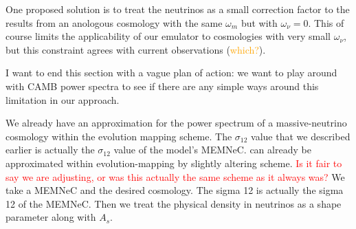One proposed solution is to treat the neutrinos as a small correction factor
to the results from an anologous cosmology with the same $\omega_m$ but with
$\omega_\nu = 0$. This of course limits the applicability of our emulator to
cosmologies with very small $\omega_\nu$, but this constraint agrees with
current observations (\textcolor{orange}{which?}).

I want to end this section with a vague plan of action: we want to play around with CAMB power spectra to see if there are any simple ways around this limitation in our approach.



We already have an approximation for the power spectrum of a massive-neutrino cosmology within the evolution mapping scheme. The $\sigma_{12}$ value that we described earlier is actually the $\sigma_{12}$ value of the model's MEMNeC. can already be approximated within evolution-mapping by slightly altering scheme. \textcolor{red}{Is it fair to say we are adjusting, or was this actually the same scheme as it always was?} We take a MEMNeC and the desired cosmology. The sigma 12 is actually the sigma 12 of the MEMNeC. Then we treat the physical density in neutrinos as a shape parameter along with $A_s$.
